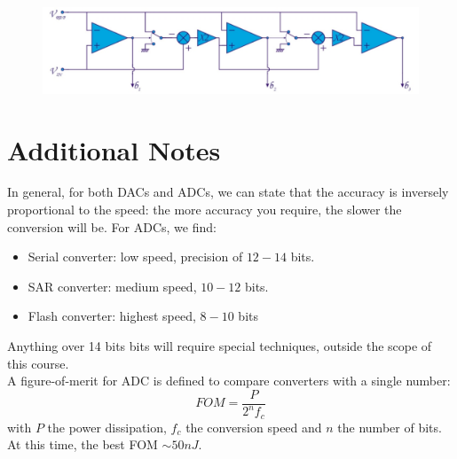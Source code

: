 \begin{figure}[h!]
	\centering
	\includegraphics[width=15cm]{figures/ch18/adc7.jpg}
	\caption{}
	\label{fig:adc7}
\end{figure}

\section{Additional Notes}
In general, for both DACs and ADCs, we can state that the accuracy is inversely proportional to the speed: the more accuracy you require, the slower the conversion will be. For ADCs, we find:
\begin{itemize}
	\item Serial converter: low speed, precision of $12-14$ bits.
	\item SAR converter: medium speed, $10 - 12$ bits.
	\item Flash converter: highest speed, $8-10$ bits
\end{itemize}
Anything over 14 bits bits will require special techniques, outside the scope of this course.\\
A figure-of-merit for ADC is defined to compare converters with a single number:
$$FOM = \frac{P}{2^n f_c}$$
with $P$ the power dissipation, $f_c$ the conversion speed and $n$ the number of bits. At this time, the best FOM $\sim 50 nJ$.
